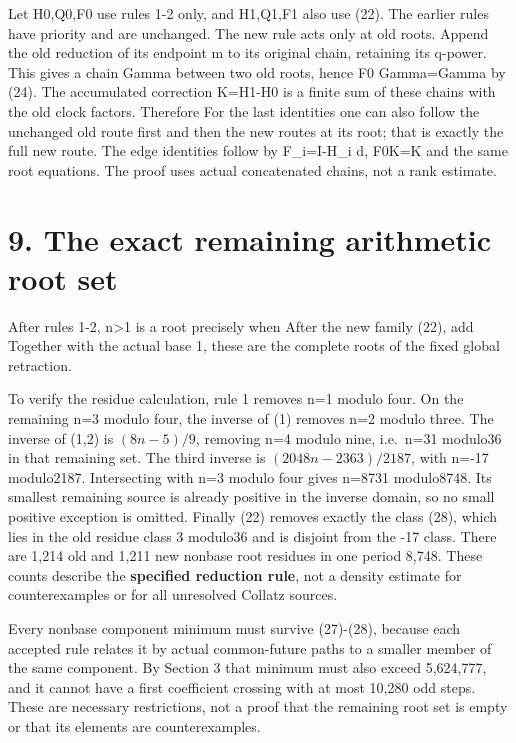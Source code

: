 Let H0,Q0,F0 use rules 1-2 only, and H1,Q1,F1 also use (22). The earlier
rules have priority and are unchanged. The new rule acts only at old
roots. Append the old reduction of its endpoint m to its original chain,
retaining its q-power. This gives a chain Gamma between two old roots,
hence F0 Gamma=Gamma by (24). The accumulated correction K=H1-H0 is a
finite sum of these chains with the old clock factors. Therefore
 For the last
identities one can also follow the unchanged old route first and then
the new routes at its root; that is exactly the full new route. The edge
identities follow by F\_i=I-H\_i d, F0K=K and the same root equations.
The proof uses actual concatenated chains, not a rank estimate.

\section{9. The exact remaining arithmetic root set}

After rules 1-2, n\textgreater1 is a root precisely when
After the new family (22), add
 Together with the actual
base 1, these are the complete roots of the fixed global retraction.

To verify the residue calculation, rule 1 removes n=1 modulo four. On
the remaining n=3 modulo four, the inverse of (1) removes n=2 modulo
three. The inverse of (1,2) is \((8n-5)/9\), removing n=4 modulo nine,
i.e.~n=31 modulo36 in that remaining set. The third inverse is
\((2048n-2363)/2187\), with n=-17 modulo2187. Intersecting with n=3
modulo four gives n=8731 modulo8748. Its smallest remaining source is
already positive in the inverse domain, so no small positive exception
is omitted. Finally (22) removes exactly the class (28), which lies in
the old residue class 3 modulo36 and is disjoint from the -17 class.
There are 1,214 old and 1,211 new nonbase root residues in one period
8,748. These counts describe the \textbf{specified reduction rule}, not
a density estimate for counterexamples or for all unresolved Collatz
sources.

Every nonbase component minimum must survive (27)-(28), because each
accepted rule relates it by actual common-future paths to a smaller
member of the same component. By Section 3 that minimum must also exceed
5,624,777, and it cannot have a first coefficient crossing with at most
10,280 odd steps. These are necessary restrictions, not a proof that the
remaining root set is empty or that its elements are counterexamples.

